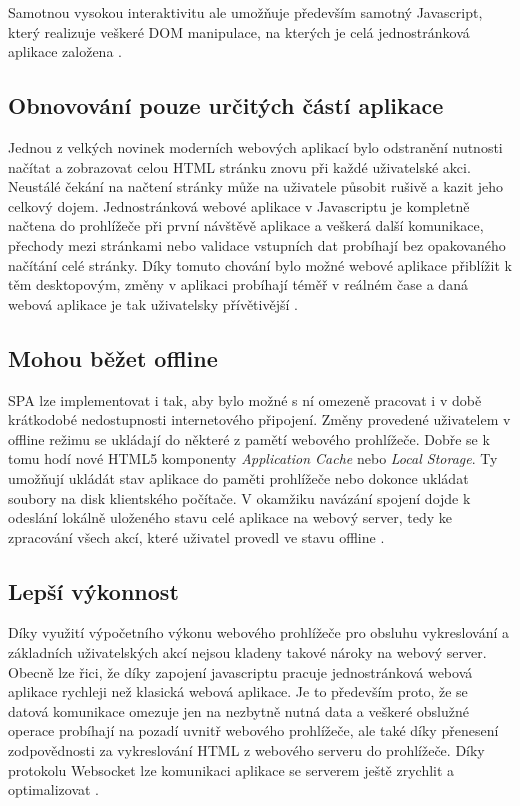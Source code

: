 Samotnou vysokou interaktivitu ale umožňuje především samotný Javascript, který realizuje veškeré DOM manipulace, na kterých je celá jednostránková aplikace založena \cite{spa_book} \cite{spa_web}. 

\subsection{Obnovování pouze určitých částí aplikace}
Jednou z velkých novinek moderních webových aplikací bylo odstranění nutnosti načítat a zobrazovat celou HTML stránku znovu při každé uživatelské akci. Neustálé čekání na načtení stránky může na uživatele působit rušivě a kazit jeho celkový dojem. Jednostránková webové aplikace v Javascriptu je kompletně načtena do prohlížeče při první návštěvě aplikace a veškerá další komunikace, přechody mezi stránkami nebo validace vstupních dat probíhají bez opakovaného načítání celé stránky. Díky tomuto chování bylo možné webové aplikace přiblížit k těm desktopovým, změny v aplikaci probíhají téměř v reálném čase a daná webová aplikace je tak uživatelsky přívětivější \cite{spa_book} \cite{spa_web}.

\subsection{Mohou běžet offline}
SPA lze implementovat i tak, aby bylo možné s ní omezeně pracovat i v době krátkodobé nedostupnosti internetového připojení. Změny provedené uživatelem v offline režimu se ukládají do některé z pamětí webového prohlížeče. Dobře se k tomu hodí nové HTML5 komponenty \textit{Application Cache} nebo \textit{Local Storage}. Ty umožňují ukládát stav aplikace do paměti prohlížeče nebo dokonce ukládat soubory na disk klientského počítače. V okamžiku navázání spojení dojde k odeslání lokálně uloženého stavu celé aplikace na webový server, tedy ke zpracování všech akcí, které uživatel provedl ve stavu offline \cite{spa_book} \cite{spa_web}.

\subsection{Lepší výkonnost}
Díky využití výpočetního výkonu webového prohlížeče pro obsluhu vykreslování a základních uživatelských akcí nejsou kladeny takové nároky na webový server. Obecně lze řici, že díky zapojení javascriptu pracuje jednostránková webová aplikace rychleji než klasická webová aplikace. Je to především proto, že se datová komunikace omezuje jen na nezbytně nutná data a veškeré obslužné operace probíhají na pozadí uvnitř webového prohlížeče, ale také díky přenesení zodpovědnosti za vykreslování HTML z webového serveru do prohlížeče. Díky protokolu Websocket lze komunikaci aplikace se serverem ještě zrychlit a optimalizovat \cite{spa_book} \cite{spa_web}.
\pagebreak

